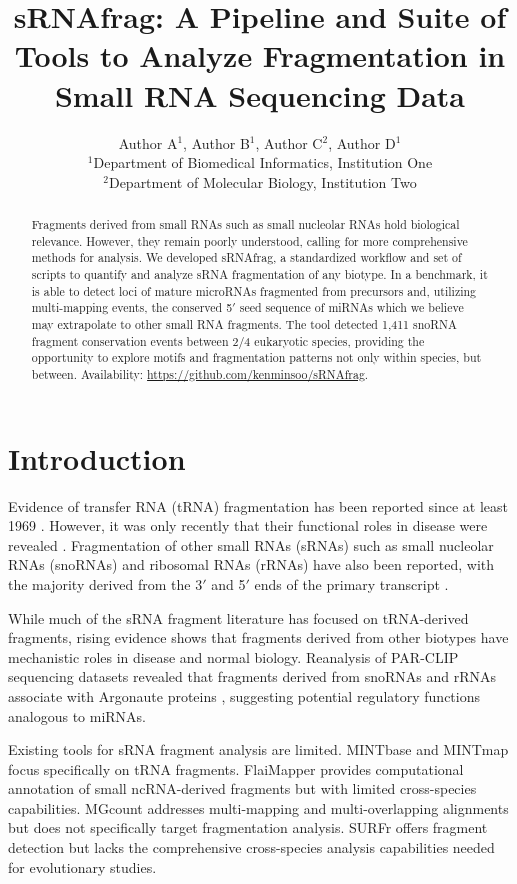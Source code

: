 \documentclass{article}
\title{sRNAfrag: A Pipeline and Suite of Tools to Analyze Fragmentation in Small RNA Sequencing Data}
\author{
Author A$^{1}$, Author B$^{1}$, Author C$^{2}$, Author D$^{1}$ \\
$^{1}$Department of Biomedical Informatics, Institution One \\
$^{2}$Department of Molecular Biology, Institution Two
}
\date{}
\begin{document}
\maketitle

\begin{abstract}
Fragments derived from small RNAs such as small nucleolar RNAs hold biological relevance. However, they remain poorly understood, calling for more comprehensive methods for analysis. We developed sRNAfrag, a standardized workflow and set of scripts to quantify and analyze sRNA fragmentation of any biotype. In a benchmark, it is able to detect loci of mature microRNAs fragmented from precursors and, utilizing multi-mapping events, the conserved 5$'$ seed sequence of miRNAs which we believe may extrapolate to other small RNA fragments. The tool detected 1,411 snoRNA fragment conservation events between 2/4 eukaryotic species, providing the opportunity to explore motifs and fragmentation patterns not only within species, but between. Availability: \url{https://github.com/kenminsoo/sRNAfrag}.
\end{abstract}

\section{Introduction}

Evidence of transfer RNA (tRNA) fragmentation has been reported since at least 1969 \citep{bayev1969reconstitution}. However, it was only recently that their functional roles in disease were revealed \citep{chen2020mechanisms, xie2022comprehensive}. Fragmentation of other small RNAs (sRNAs) such as small nucleolar RNAs (snoRNAs) and ribosomal RNAs (rRNAs) have also been reported, with the majority derived from the 3$'$ and 5$'$ ends of the primary transcript \citep{taft2012extensive, kishore2010snoRNA, yu2017human, lemus2022microRNA, zong2021computational, he2020human, falaleeva2017argonaute, taft2009small}.

While much of the sRNA fragment literature has focused on tRNA-derived fragments, rising evidence shows that fragments derived from other biotypes have mechanistic roles in disease and normal biology. Reanalysis of PAR-CLIP sequencing datasets revealed that fragments derived from snoRNAs and rRNAs associate with Argonaute proteins \citep{falaleeva2017argonaute}, suggesting potential regulatory functions analogous to miRNAs.

Existing tools for sRNA fragment analysis are limited. MINTbase \citep{pliatsika2018mintbase} and MINTmap \citep{loher2017mintmap} focus specifically on tRNA fragments. FlaiMapper \citep{hoogstrate2015flairmapper} provides computational annotation of small ncRNA-derived fragments but with limited cross-species capabilities. MGcount \citep{miani2022mgcount} addresses multi-mapping and multi-overlapping alignments but does not specifically target fragmentation analysis. SURFr offers fragment detection but lacks the comprehensive cross-species analysis capabilities needed for evolutionary studies.
\end{document}
